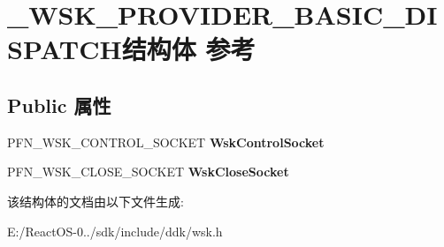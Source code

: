 \hypertarget{struct___w_s_k___p_r_o_v_i_d_e_r___b_a_s_i_c___d_i_s_p_a_t_c_h}{}\section{\+\_\+\+W\+S\+K\+\_\+\+P\+R\+O\+V\+I\+D\+E\+R\+\_\+\+B\+A\+S\+I\+C\+\_\+\+D\+I\+S\+P\+A\+T\+C\+H结构体 参考}
\label{struct___w_s_k___p_r_o_v_i_d_e_r___b_a_s_i_c___d_i_s_p_a_t_c_h}
\subsection*{Public 属性}
\begin{DoxyCompactItemize}
\item 
\mbox{\label{struct___w_s_k___p_r_o_v_i_d_e_r___b_a_s_i_c___d_i_s_p_a_t_c_h_a45e1d59bd3f7db8e041d8b90ec9b4818}} 
P\+F\+N\+\_\+\+W\+S\+K\+\_\+\+C\+O\+N\+T\+R\+O\+L\+\_\+\+S\+O\+C\+K\+ET {\bfseries Wsk\+Control\+Socket}
\item 
\mbox{\label{struct___w_s_k___p_r_o_v_i_d_e_r___b_a_s_i_c___d_i_s_p_a_t_c_h_a4298a3c3579dccdf8c0ee984f3b30cd1}} 
P\+F\+N\+\_\+\+W\+S\+K\+\_\+\+C\+L\+O\+S\+E\+\_\+\+S\+O\+C\+K\+ET {\bfseries Wsk\+Close\+Socket}
\end{DoxyCompactItemize}


该结构体的文档由以下文件生成\+:\begin{DoxyCompactItemize}
\item 
E\+:/\+React\+O\+S-\/0../sdk/include/ddk/wsk.\+h\end{DoxyCompactItemize}
